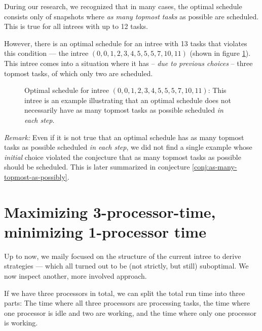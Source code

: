 During our research, we recognized that in many cases, the optimal schedule consists only of snapshots where \emph{as many topmost tasks} as possible are scheduled. This is true for all intrees with up to 12 tasks.

However, there is an optimal schedule for an intree with 13 tasks that violates this condition ---  the intree $(0,0,1,2,3,4,5,5,5,7,10,11)$ (shown in figure \ref{fig:as-many-topmost-tasks-as-possible-false}). This intree comes into a situation where it has -- \emph{due to previous choices} -- three topmost tasks, of which only two are scheduled.

\begin{figure}[th]
  \centering
  
  \caption{Optimal schedule for intree $(0,0,1,2,3,4,5,5,5,7,10,11)$: This intree is an example illustrating that an optimal schedule does not necessarily have as many topmost tasks as possible scheduled \emph{in each step}.}
  \label{fig:as-many-topmost-tasks-as-possible-false}
\end{figure}

\emph{Remark:} Even if it is not true that an optimal schedule has as many topmost tasks as possible scheduled \emph{in each step}, we did not find a single example whose \emph{initial} choice violated the conjecture that as many topmost tasks as possible should be scheduled. This is later summarized in conjecture \ref{conj:as-many-topmost-as-possibly}.

\section{Maximizing 3-processor-time, minimizing 1-processor time}
\label{sec:p3-disproving-long-p3-and-short-p1-time}

Up to now, we maily focused on the structure of the current intree to derive strategies --- which all turned out to be (not strictly, but still) suboptimal. We now inspect another, more involved approach.

If we have three processors in total, we can split the total run time into three parts: The time where all three processors are processing tasks, the time where one processor is idle and two are working, and the time where only one processor is working.


